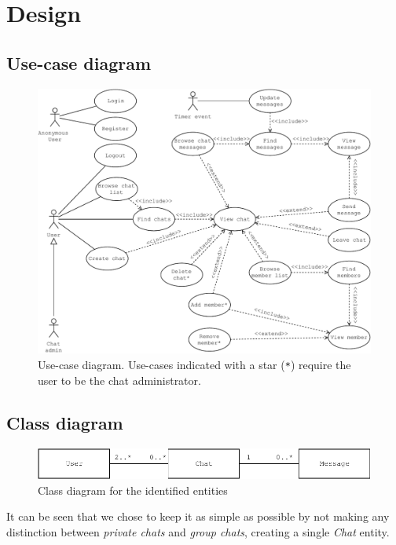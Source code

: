 \documentclass[10pt]{article}
\begin{document}
\clearpage
\section{Design}
\subsection{Use-case diagram}
\begin{figure}[h!]
    \centering
    \includegraphics[width=\textwidth]{figs/use_case_diagram}
    \caption{Use-case diagram. Use-cases indicated with a star (\texttt{*})
        require the user to be the chat administrator.}
    \label{fig:usecase}
\end{figure}

\subsection{Class diagram}
\begin{figure}[h!]
    \centering
    \includegraphics[width=\textwidth]{figs/class_diagram}
    \caption{Class diagram for the identified entities}
    \label{fig:class_diagram}
\end{figure}

It can be seen that we chose to keep it as simple as possible by not making  
any distinction between \emph{private chats} and \emph{group chats}, 
creating a single \emph{Chat} entity.
\clearpage
\end{document}
